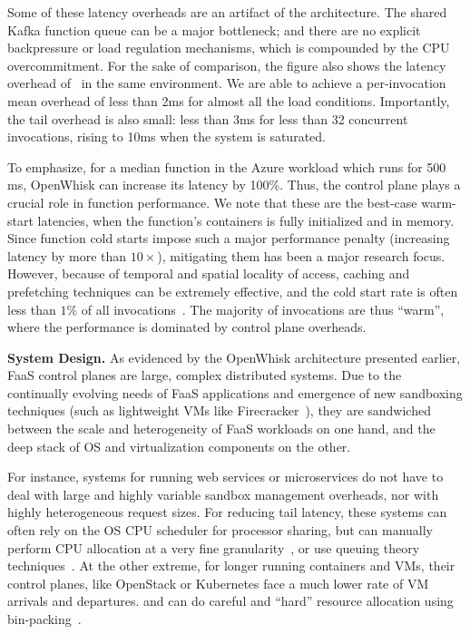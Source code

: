 Some of these latency overheads are an artifact of the architecture. 
The shared Kafka function queue can be a major bottleneck; and there are no explicit backpressure or load regulation mechanisms, which is compounded by the CPU overcommitment. 
%
For the sake of comparison, the figure also shows the latency overhead of \sysname~in the same environment. 
We are able to achieve a per-invocation mean overhead of less than 2ms for almost all the load conditions.
Importantly, the tail overhead is also small: less than 3ms for less than 32 concurrent invocations, rising to 10ms when the system is saturated.


To emphasize, for a median function in the Azure workload which runs for 500 ms, OpenWhisk can increase its latency by 100\%.  
Thus, the control plane plays a crucial role in function performance.
We note that these are the best-case warm-start latencies, when the function's containers is fully initialized and in memory. 
Since function cold starts impose such a major performance penalty (increasing latency by more than $10\times$), mitigating them has been a major research focus. 
However, because of temporal and spatial locality of access, caching and prefetching techniques can be extremely effective, and the cold start rate is often less than $1\% $ of all invocations~\cite{faascache-asplos21}. 
The majority of invocations are thus ``warm'', where the performance is dominated by control plane overheads.

\noindent \textbf{System Design.}
%
As evidenced by the OpenWhisk architecture presented earlier, FaaS control planes are large, complex distributed systems.
Due to the continually evolving needs of FaaS applications and emergence of new sandboxing techniques (such as lightweight VMs like Firecracker~\cite{firecracker-nsdi20}), they are sandwiched between the scale and heterogeneity of FaaS workloads on one hand, and the deep stack of OS and virtualization components on the other. 

For instance, systems for running web services or microservices do not have to deal with large and highly variable sandbox management overheads, nor with highly heterogeneous request sizes.
For reducing tail latency, these systems can often rely on the OS CPU scheduler for processor sharing, but can manually perform CPU allocation at a very fine granularity~\cite{kaffes2019shinjuku}, or use queuing theory techniques~\cite{prekas2017zygos}. 
At the other extreme, for longer running containers and VMs, their control planes, like OpenStack or Kubernetes face a much lower rate of VM arrivals and departures. and can do careful and ``hard'' resource allocation using bin-packing~\cite{cortez2017resource}.


